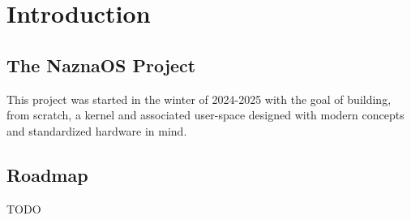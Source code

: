 
\section{Introduction}

\subsection{The NaznaOS Project}

This project was started in the winter of 2024-2025 with the goal of building, from scratch, a kernel and associated user-space designed with modern concepts and standardized hardware in mind.

\subsection{Roadmap}

TODO